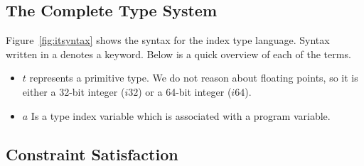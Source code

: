 \subsection{The Complete \name Type System}
Figure~\ref{fig:itsyntax} shows the syntax for the index type language.
Syntax written in a  denotes a \wasm keyword.
Below is a quick overview of each of the terms.

\begin{itemize}
    \item $t$ represents a primitive \wasm type.
    We do not reason about floating points, so it is either a 32-bit integer ($i32$) or a 64-bit integer ($i64$).
    \item $a$ Is a type index variable which is associated with a program variable.
\end{itemize}



\subsection{Constraint Satisfaction}
